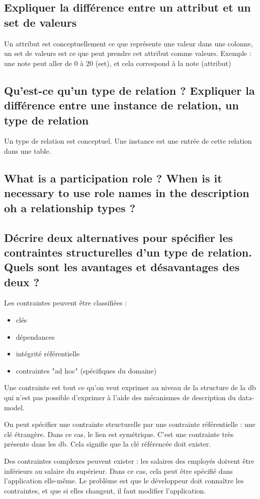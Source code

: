 \subsection{Expliquer la différence entre un attribut et un set de valeurs}
Un attribut est conceptuellement ce que représente une valeur dans une 
colonne, un set de valeurs est ce que peut prendre cet attribut comme valeurs.
Exemple : une note peut aller de 0 à 20 (set), et cela correspond à la note (attribut)

\subsection{Qu'est-ce qu'un type de relation ? Expliquer la différence entre une instance de relation, un type de relation}
Un type de relation est conceptuel. Une instance est une entrée de cette relation dans une table.

\subsection{What is a participation role ? When is it necessary to use role names in the description oh a relationship types ?}


\subsection{Décrire deux alternatives pour spécifier les contraintes structurelles d'un type de relation. Quels sont les avantages et désavantages des deux ?}
Les contraintes peuvent être classifiées : 
\begin{itemize}
	\item clés
	\item dépendances
	\item intégrité référentielle
	\item contraintes "ad hoc" (spécifiques du domaine)
\end{itemize}
Une contrainte est tout ce qu'on veut exprimer au niveau de la 
structure de la db qui n'est pas possible d'exprimer 
à l'aide des mécanismes de description du data-model.

On peut spécifier une contrainte structurelle par une contrainte référentielle : 
une clé étrangère. Dans ce cas, le lien est symétrique. C'est une contrainte 
très présente dans les db. Cela signifie que la clé référencée 
doit exister. 

Des contraintes complexes peuvent exister : les salaires des employés doivent 
être inférieurs au salaire du supérieur. 
Dans ce cas, cela peut être spécifié dans l'application elle-même. 
Le problème est que le développeur doit connaître les contraintes, 
et que si elles changent, il faut modifier l'application.

